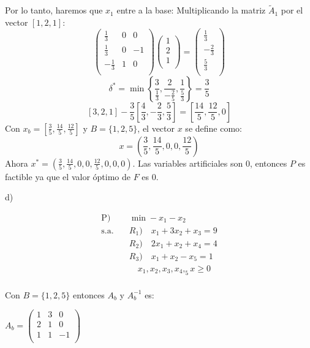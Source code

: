 \documentclass{article}
\begin{document}
\begin{flushleft}
		Por lo tanto, haremos que \(x_1\) entre a la base:
		Multiplicando la matriz \(\tilde{A}_1\) por el vector \([1, 2, 1]\):
		\[
		\begin{pmatrix}
		\frac{1}{3} & 0 & 0 \\
		\frac{1}{3} & 0 & -1 \\
		-\frac{1}{3} & 1 & 0 \\
		\end{pmatrix}
		\begin{pmatrix}
		1 \\
		2 \\
		1 \\
		\end{pmatrix}
		=
		\begin{pmatrix}
		\frac{1}{3} \\
		-\frac{2}{3} \\
		\frac{5}{3} \\
		\end{pmatrix}
		\]
		\[
			\delta^* = \min \left\{ \frac{3}{\frac{1}{3}}, \frac{2}{-\frac{2}{5}}, \frac{1}{\frac{5}{3}} \right\} = \frac{3}{5}
		\]
		\[
		[3, 2, 1] - \frac{3}{5}[\frac{4}{3}, -\frac{2}{3}, \frac{5}{3}] = [\frac{14}{5}, \frac{12}{5}, 0]
		\]
		Con \(x_b = \left[\frac{3}{5}, \frac{14}{5}, \frac{12}{5}\right]\) y \(B = \{1, 2, 5\}\), el vector \(x\) se define como:
		\[
		x = \left(\frac{3}{5}, \frac{14}{5}, 0, 0, \frac{12}{5}\right)
		\]
		Ahora \(x^* = \left(\frac{3}{5}, \frac{14}{5}, 0, 0, \frac{12}{5}, 0, 0, 0\right)\). Las variables artificiales son \(0\), entonces \(P\) es factible ya que el valor óptimo de \(F\) es \(0\).
		\vspace{0,5cm}
		
		d) \\
		\begin{center}
			\begin{align*}
				\text{P}) & \quad \min -x_1 - x_2 \\
				\text{s.a.} & \quad  R_1) \quad x_1 + 3x_2 + x_3 = 9 \\
						   & \quad R_2) \quad 2x_1 + x_2 + x_4 = 4 \\
						   & \quad R_3) \quad x_1 + x_2 - x_5 = 1 \\
						   & \quad  \quad x_1,x_2,x_3,x_4,_5x\geq 0\\
			\end{align*}
		\end{center}
		Con \(B = \{1, 2, 5\}\) entonces $A_b$ y $A_b^{-1}$ es:

		\(A_b =  \begin{pmatrix}
			1 & 3 & 0 \\
			2 & 1 & 0 \\
			1 & 1 & -1 \\
			\end{pmatrix}\)
			

\end{flushleft}
\end{document}
